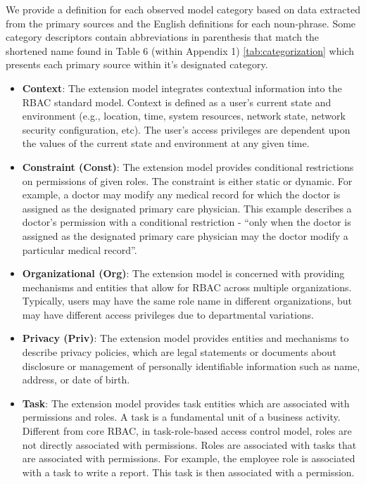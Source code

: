We provide a definition for each observed model category based on data extracted from the primary sources and the English definitions for each noun-phrase.
Some category descriptors contain abbreviations in parenthesis that match the shortened name found in Table 6 (within Appendix 1) \ref{tab:categorization} which presents each primary source within it's designated category.

\begin{itemize}

  \item \textbf{Context}: The extension model integrates contextual information into the RBAC standard model. Context is defined as a user's current state and environment (e.g., location, time, system resources, network state, network security configuration, etc). The user's access privileges are dependent upon the values of the current state and environment at any given time.

  \item \textbf{Constraint (Const)}: The extension model provides conditional restrictions on permissions of given roles. The constraint is either static or dynamic. For example, a doctor may modify any medical record for which the doctor is assigned as the designated primary care physician. This example describes a doctor's permission with a conditional restriction - ``only when the doctor is assigned as the designated primary care physician may the doctor modify a particular medical record''.

  \item \textbf{Organizational (Org)}: The extension model is concerned with providing mechanisms and entities that allow for RBAC across multiple organizations. Typically, users may have the same role name in different organizations, but may have different access privileges due to departmental variations.
  
  \item \textbf{Privacy (Priv)}: The extension model provides entities and mechanisms to describe privacy policies, which are legal statements or documents about disclosure or management of personally identifiable information such as name, address, or date of birth.
  
  \item \textbf{Task}: The extension model provides task entities which are associated with permissions and roles. A task is a fundamental unit of a business activity. Different from core RBAC, in task-role-based access control model, roles are not directly associated with permissions. Roles are associated with tasks that are associated with permissions. For example, the employee role is associated with a task to write a report. This task is then associated with a permission.


\end{itemize}
